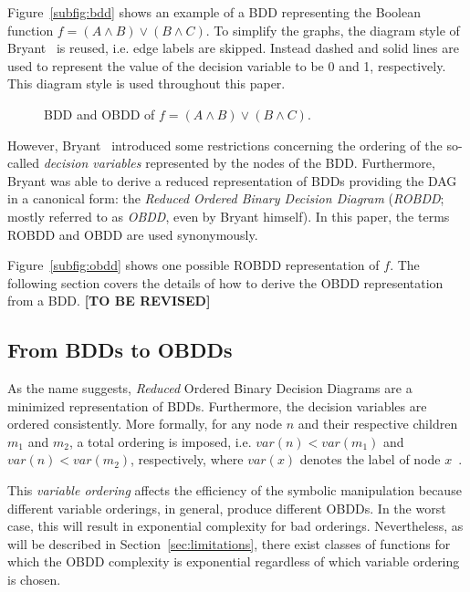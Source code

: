 \documentclass{vldb}
\newcommand{\tbr}{\textbf{[TO BE REVISED]}}
\begin{document}
Figure~\ref{subfig:bdd} shows an example of a BDD representing the Boolean function
$f=(A \land B) \lor (B \land C)$. To simplify the graphs, the diagram style of
Bryant~\cite{BRYANT92} is reused, i.e. edge labels are skipped. Instead dashed
and solid lines are used to represent the value of the decision variable to be 0
and 1, respectively. This diagram style is used throughout this paper.

\begin{figure}[ht]
    \centering
    \subfigure[BDD]{
        
        \label{subfig:bdd}
    }
    \hskip1cm
    \subfigure[OBDD]{
        
        \label{subfig:obdd}
    }
    \caption{BDD and OBDD of $f=(A \land B) \lor (B \land C)$.}
    \label{fig:bdd-and-obdd}
\end{figure}

However, Bryant~\cite{BRYANT86} introduced some restrictions concerning the
ordering of the so-called \textit{decision variables} represented by the nodes
of the BDD. Furthermore, Bryant\cite{BRYANT86} was able to derive a reduced
representation of BDDs providing the DAG in a canonical form: the
\textit{Reduced Ordered Binary Decision Diagram} (\textit{ROBDD}; mostly referred
to as \textit{OBDD}, even by Bryant himself). In this paper, the terms ROBDD and
OBDD are used synonymously.

Figure~\ref{subfig:obdd} shows one possible ROBDD representation of
$f$. The following section covers the details of how
to derive the OBDD representation from a BDD. \tbr

\subsection{From BDDs to OBDDs}
\label{subsec:from-bdds-to-obdds}

As the name suggests, \textit{Reduced} Ordered Binary Decision Diagrams are a 
minimized representation of BDDs. Furthermore, the decision variables are ordered
consistently. More formally, for any node $n$ and their respective children $m_1$
and $m_2$, a total ordering is imposed, i.e. $var(n) < var(m_1)$ and
$var(n) < var(m_2)$, respectively, where $var(x)$ denotes the label of node
$x$~\cite{BRYANT86, BRYANT92}.

This \textit{variable ordering} affects the efficiency of the symbolic
manipulation because different variable orderings, in general, produce different
OBDDs. In the worst case, this will result in exponential complexity for bad
orderings. Nevertheless, as will be described in Section~\ref{sec:limitations},
there exist classes of functions for which the OBDD complexity is exponential
regardless of which variable ordering is chosen.
\end{document}
